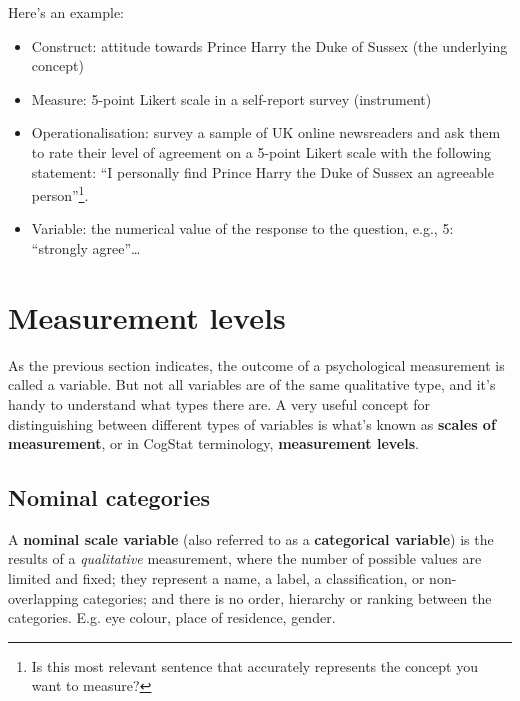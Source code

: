 \documentclass[
  11pt,
  a4paper,
  twoside,symmetric,openright]{book}
\providecommand{\tightlist}{%
  \setlength{\itemsep}{0pt}\setlength{\parskip}{0pt}}
\theoremstyle{break}
\theoremstyle{break}
\begin{document}
\begin{example}[Method]
\protect\hypertarget{exm:exops}{}\label{exm:exops}

Here's an example:

\begin{itemize}
\tightlist
\item
  Construct: attitude towards Prince Harry the Duke of Sussex (the underlying concept)
\item
  Measure: 5-point Likert scale in a self-report survey (instrument)
\item
  Operationalisation: survey a sample of UK online newsreaders and ask them to rate their level of agreement on a 5-point Likert scale with the following statement: ``I personally find Prince Harry the Duke of Sussex an agreeable person''\footnote{Is this most relevant sentence that accurately represents the concept you want to measure?}.
\item
  Variable: the numerical value of the response to the question, e.g., 5: ``strongly agree''\ldots{}
\end{itemize}

\end{example}

\hypertarget{scales}{%
\section{Measurement levels}\label{scales}}

As the previous section indicates, the outcome of a psychological measurement is called a variable. But not all variables are of the same qualitative type, and it's handy to understand what types there are. A very useful concept for distinguishing between different types of variables is what's known as \textbf{scales of measurement}, or in CogStat terminology, \textbf{measurement levels}.

\hypertarget{nominalscale}{%
\subsection{Nominal categories}\label{nominalscale}}

\begin{definition}
\protect\hypertarget{def:defnominal}{}\label{def:defnominal}A \textbf{nominal scale variable} (also referred to as a \textbf{categorical variable}) is the results of a \emph{qualitative} measurement, where the number of possible values are limited and fixed; they represent a name, a label, a classification, or non-overlapping categories; and there is no order, hierarchy or ranking between the categories. E.g. eye colour, place of residence, gender.
\end{definition}
\end{document}
